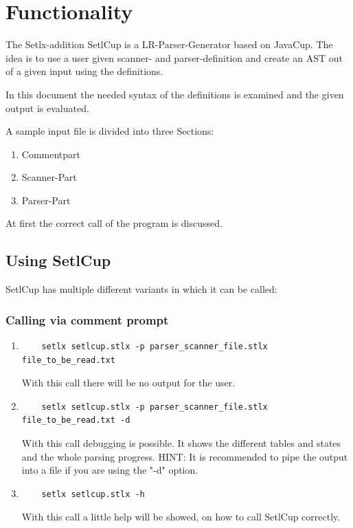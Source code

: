 \chapter{Functionality}

The Setlx-addition SetlCup is a LR-Parser-Generator based on JavaCup.
The idea is to use a user given scanner- and parser-definition and create an AST out of a given input using the definitions.

In this document the needed syntax of the definitions is examined and the given output is evaluated.

A sample input file is divided into three Sections:
\begin{enumerate}
	\item Commentpart
	\item Scanner-Part
	\item Parser-Part
\end{enumerate}

At first the correct call of the program is discussed.
\section{Using SetlCup}
SetlCup has multiple different variants in which it can be called:
\subsection{Calling via comment prompt}
\begin{enumerate}
	\item \begin{Verbatim}
	setlx setlcup.stlx -p parser_scanner_file.stlx file_to_be_read.txt 
	\end{Verbatim}
			With this call there will be no output for the user.
	\item \begin{Verbatim}
	setlx setlcup.stlx -p parser_scanner_file.stlx file_to_be_read.txt -d
	\end{Verbatim}
			With this call debugging is possible. It shows the different tables and states and the whole parsing progress. HINT: It is recommended to pipe the output into a file if you are using the "-d" option.
	\item \begin{Verbatim}
	setlx setlcup.stlx -h
	\end{Verbatim}
			With this call a little help will be showed, on how to call SetlCup correctly.
\end{enumerate}
